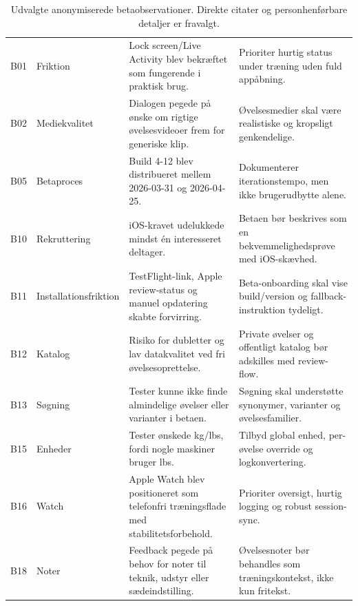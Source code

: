 \begin{table}[htbp]
\footnotesize
\renewcommand{\arraystretch}{1.12}
\begin{tabularx}{\textwidth}{>{\RaggedRight\arraybackslash}p{} >{\RaggedRight\arraybackslash}p{} >{\RaggedRight\arraybackslash}p{} Y}
\toprule
{} &  &  &  \\
\midrule
B01 & Friktion & Lock screen/Live Activity blev bekræftet som fungerende i praktisk brug. & Prioriter hurtig status under træning uden fuld appåbning. \\
B02 & Mediekvalitet & Dialogen pegede på ønske om rigtige øvelsesvideoer frem for generiske klip. & Øvelsesmedier skal være realistiske og kropsligt genkendelige. \\
B05 & Betaproces & Build 4-12 blev distribueret mellem 2026-03-31 og 2026-04-25. & Dokumenterer iterationstempo, men ikke brugerudbytte alene. \\
B10 & Rekruttering & iOS-kravet udelukkede mindst én interesseret deltager. & Betaen bør beskrives som en bekvemmelighedsprøve med iOS-skævhed. \\
B11 & Installationsfriktion & TestFlight-link, Apple review-status og manuel opdatering skabte forvirring. & Beta-onboarding skal vise build/version og fallback-instruktion tydeligt. \\
B12 & Katalog & Risiko for dubletter og lav datakvalitet ved fri øvelsesoprettelse. & Private øvelser og offentligt katalog bør adskilles med review-flow. \\
B13 & Søgning & Tester kunne ikke finde almindelige øvelser eller varianter i betaen. & Søgning skal understøtte synonymer, varianter og øvelsesfamilier. \\
B15 & Enheder & Tester ønskede kg/lbs, fordi nogle maskiner bruger lbs. & Tilbyd global enhed, per-øvelse override og logkonvertering. \\
B16 & Watch & Apple Watch blev positioneret som telefonfri træningsflade med stabilitetsforbehold. & Prioriter oversigt, hurtig logging og robust session-sync. \\
B18 & Noter & Feedback pegede på behov for noter til teknik, udstyr eller sædeindstilling. & Øvelsesnoter bør behandles som træningskontekst, ikke kun fritekst. \\
\bottomrule
\end{tabularx}
\caption{Udvalgte anonymiserede betaobservationer. Direkte citater og personhenførbare detaljer er fravalgt.}
\label{tab:tm-beta-feedback}
\end{table}

